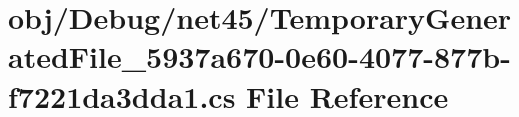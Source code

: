 \hypertarget{_debug_2net45_2_temporary_generated_file__5937a670-0e60-4077-877b-f7221da3dda1_8cs}{}\section{obj/\+Debug/net45/\+Temporary\+Generated\+File\+\_\+5937a670-\/0e60-\/4077-\/877b-\/f7221da3dda1.cs File Reference}
\label{_debug_2net45_2_temporary_generated_file__5937a670-0e60-4077-877b-f7221da3dda1_8cs}
